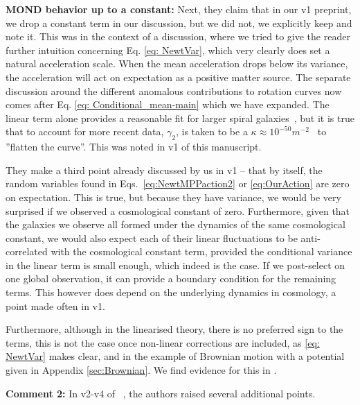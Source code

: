 \documentclass[aps,pra,amsmath,amssymb,amsthm,floatfix,nofootinbib,notitlepage,superscriptaddress,10pt]{revtex4-2}
\begin{document}
{\bf\noindent MOND behavior up to a constant:}  Next, they claim that in our v1 preprint, we drop a constant term in our discussion, but we did not, we explicitly keep and note it.  This was in the context of a discussion, where we tried to give the reader further intuition concerning Eq. \eqref{eq: NewtVar}, which very clearly does set a natural acceleration scale. When the mean acceleration drops below its variance, the acceleration will act on expectation as a positive matter source. The separate discussion around the different anomalous contributions to rotation curves now comes after Eq. \eqref{eq: Conditional_mean-main} which we have expanded. The linear term alone provides a reasonable fit for larger spiral galaxies~\cite{mannheim1989exact},  but it is true that to account for more recent data, $\gamma_2$, is taken to be a $\kappa \approx 10^{-50} m^{-2}$~\cite{mannheim2012fitting} to ''flatten the curve''. This was noted in v1 of this manuscript.

They make a third point already discussed by us in v1 
-- that by itself, the random variables found in Eqs.~\eqref{eq:NewtMPPaction2} or \eqref{eq:OurAction} are zero on expectation. This is true, but because they have variance, we would be very surprised if we observed a cosmological constant of zero. Furthermore, given that the galaxies we observe all formed under the dynamics of the same cosmological constant, we would also expect each of their linear fluctuations to be anti-correlated with the cosmological constant term, provided the conditional variance in the linear term is small enough, which indeed is the case. If we post-select on one global observation, it can provide a boundary condition for the remaining terms. This however does depend on the underlying dynamics in cosmology,
a point made often in v1.

Furthermore, although in the linearised theory, there is no preferred sign to the terms, this is not the case once non-linear corrections are included, as \eqref{eq: NewtVar} makes clear, and in the example of Brownian motion with a potential given in Appendix \ref{sec:Brownian}. We find evidence for this in \cite{UCLcosmo}.
\newline

{\bf\noindent Comment 2:} In v2-v4 of ~\cite{hertzberg2024comment}, the authors raised several additional points.
\end{document}
